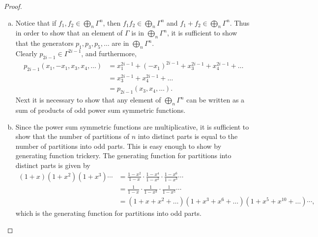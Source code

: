 \documentclass{article}
\begin{document}
\begin{proof} ~
  \begin{enumerate}[(a)]
    \item
    Notice that if $f_1, f_2 \in \bigoplus_n \Gamma^n$, then
    $f_1f_2 \in \bigoplus_n \Gamma^n$ and $f_1 + f_2 \in \bigoplus_n \Gamma^n$.
    Thus in order to show that an element of $\Gamma$ is in $\bigoplus_n \Gamma^n$,
    it is sufficient to show that the generators $p_1, p_3, p_5, \hdots$ are in
    $\bigoplus_n \Gamma^n$.
    \\
    Clearly $p_{2i-1} \in \Gamma^{2i-1}$, and furthermore, \begin{align*}
      p_{2i-1}(x_1, -x_1, x_3, x_4, \hdots)
      &= x_1^{2i-1} + (-x_1)^{2i-1} + x_3^{2i-1} + x_4^{2i-1} + \hdots \\
      &= x_3^{2i-1} + x_4^{2i-1} + \hdots \\
      &= p_{2i-1}(x_3, x_4, \hdots).
    \end{align*}
    Next it is necessary to show that any element of $\bigoplus_n \Gamma^n$ can
    be written as a sum of products of odd power sum symmetric functions.

    \item Since the power sum symmetric functions are multiplicative, it is
    sufficient to show that the number of partitions of $n$ into
    distinct parts is equal to the number of partitions into odd parts.
    This is easy enough to show by generating function trickery.
    The generating function for partitions into distinct parts is given by
    \begin{align*}
      (1 + x)(1 + x^2)(1 + x^3)\cdots
      &= \frac{1-x^2}{1-x}\cdot\frac{1-x^4}{1-x^2}\cdot\frac{1-x^6}{1-x^3}\cdots \\
      &= \frac{1}{1-x}\cdot\frac{1}{1-x^3}\cdot\frac{1}{1-x^5}\cdots \\
      &= (1 + x + x^2 + \hdots)(1 + x^3 + x^6 + \hdots)(1 + x^5 + x^{10} + \hdots)\cdots,
    \end{align*}
    which is the generating function for partitions into odd parts.
  \end{enumerate}
\end{proof}
\end{document}
